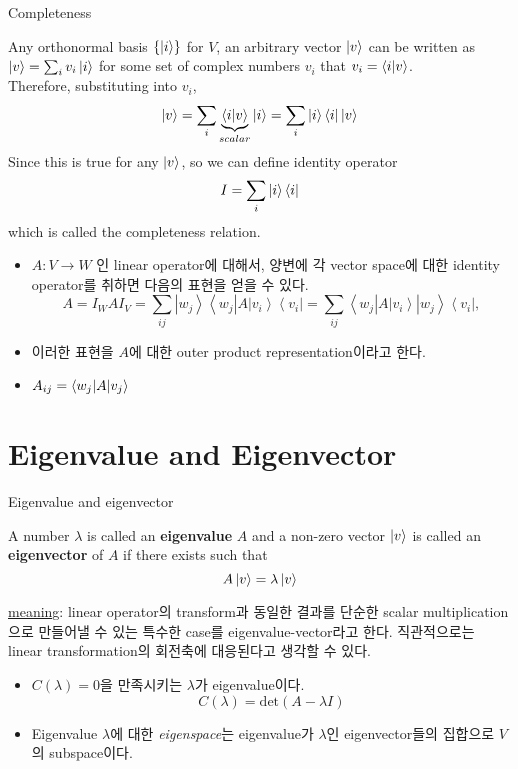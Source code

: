 \documentclass[9pt]{beamer}
\begin{document}
    \begin{frame}{Completeness}
        \begin{theorem}[completeness]
            Any orthonormal basis $\{\ket i \}$ for $V$, an arbitrary vector $\ket v$ can be written as
            $ \ket v = \sum_{i} v_i \ket{i} $
            for some set of complex numbers $v_i$ that $v_i  = \braket{i | v}$.\\  Therefore, substituting into  $v_i$,
            $$\ket v = \sum_i \underbrace{\braket{i|v}}_{scalar} \ket i =  { \sum_i \ket i \bra i} \ket v$$
            Since this is true for any $\ket v$, so we can define identity operator 
            $$ I = \sum_i \ket i \bra i$$
            which is called the completeness relation.
        \end{theorem}
        \begin{itemize}
            \item $A: V \rightarrow W$ 인 linear operator에 대해서, 양변에 각 vector space에 대한 identity operator를 취하면 다음의 표현을 얻을 수 있다. 
            $$ A=I_W A I_V=\sum_{i j}\left|w_j\right\rangle\left\langle w_j\right| A\left|v_i\right\rangle\left\langle v_i\right|=\sum_{i j}\left\langle w_j\right| A\left|v_i\right\rangle\left|w_j\right\rangle\left\langle v_i\right|, $$
            \item 이러한 표현을 $A$에 대한 outer product representation이라고 한다.
            \item $A_{ij} = \braket{w_j | A | v_j}$
        \end{itemize}
    \end{frame}

    \section{Eigenvalue and Eigenvector}
    \begin{frame}{Eigenvalue and eigenvector}
        \begin{definition}
            A number $\lambda$ is called an \textbf{eigenvalue} $A$ and a non-zero vector $\ket v$ is called an \textbf{eigenvector} of $A$ if there exists such that 
            $$A \ket v = \lambda \ket v$$
        \end{definition}
        \checkmark \underline{meaning}: linear operator의 transform과 동일한 결과를 단순한 scalar multiplication으로 만들어낼 수 있는 특수한 case를 eigenvalue-vector라고 한다. 직관적으로는 linear transformation의 회전축에 대응된다고 생각할 수 있다.
        \vspace{0.3cm}
        \begin{itemize}
            \item $C(\lambda) = 0$을 만족시키는 $\lambda$가 eigenvalue이다.
            $$C(\lambda) = \text{det}(A - \lambda I)$$
            \item Eigenvalue $\lambda$에 대한 \textit{eigenspace}는 eigenvalue가 $\lambda$인 eigenvector들의 집합으로 $V$의 subspace이다.
        \end{itemize}
    \end{frame}
\end{document}
